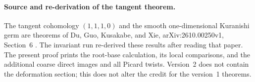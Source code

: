 \paragraph{Source and re-derivation of the tangent theorem.}
The tangent cohomology $(1,1,1,0)$ and the smooth one-dimensional
Kuranishi germ are theorems of Du, Guo, Kusakabe, and Xie,
arXiv:2610.00250v1, Section~6 \citep{DuEtAl2026v1}.
The invariant run re-derived these results after reading that paper.
The present proof prints the root-base calculation, its local
comparisons, and the additional coarse direct images and all Picard
twists. Version~2 \citep{DuEtAl2026v2} does not contain the deformation
section; this does not alter the credit for the version~1 theorems.
